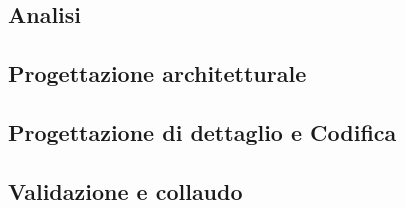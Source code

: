 \documentclass[../piano-di-progetto.tex]{subfiles}
\begin{document}
	\subsection{Analisi}
  \label{subsec:analisi}
  \subsection{Progettazione architetturale}
  \label{subsec:progettazione_architetturale}
  \subsection{Progettazione di dettaglio e Codifica}
  \label{subsec:progettazione_dettaglio_codifica}
  \subsection{Validazione e collaudo}
  \label{subsec:validazione_collaudo}
  
\end{document}
